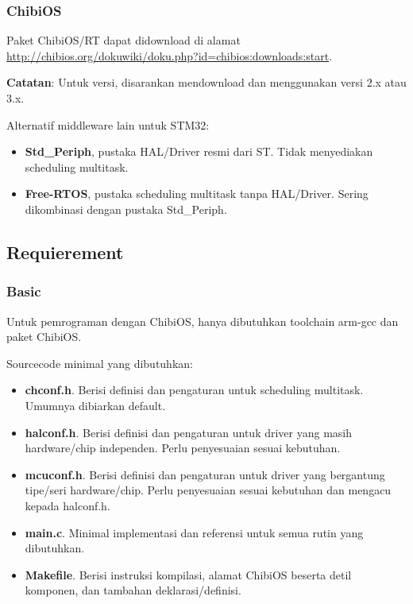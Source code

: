 \documentclass[table,dvipsnames]{beamer}
\begin{document}
	\begin{frame}
		\frametitle{ChibiOS}
		\begin{exampleblock}{}
			Paket ChibiOS/RT dapat didownload di alamat\\
			\url{http://chibios.org/dokuwiki/doku.php?id=chibios:downloads:start}.
		\end{exampleblock}

		\begin{exampleblock}{}
			\textbf{Catatan}: Untuk versi, disarankan mendownload dan menggunakan versi 2.x atau 3.x.
		\end{exampleblock}

		\begin{exampleblock}{}
			Alternatif middleware lain untuk STM32:
			\begin{itemize}
				\item \textbf{Std\_Periph}, pustaka HAL/Driver resmi dari ST. Tidak menyediakan scheduling multitask.
				\item \textbf{Free-RTOS}, pustaka scheduling multitask tanpa HAL/Driver. Sering dikombinasi dengan pustaka Std\_Periph.
			\end{itemize}
		\end{exampleblock}
	\end{frame}

	\subsection{Requierement}
	\begin{frame}
		\frametitle{Basic}
		\begin{exampleblock}{}
			Untuk pemrograman dengan ChibiOS, hanya dibutuhkan toolchain arm-gcc dan paket ChibiOS.
		\end{exampleblock}

		\begin{exampleblock}{}
			Sourcecode minimal yang dibutuhkan:
			\begin{itemize}
				\item \textbf{chconf.h}. Berisi definisi dan pengaturan untuk scheduling multitask.
				Umumnya dibiarkan default.
				\item \textbf{halconf.h}. Berisi definisi dan pengaturan untuk driver yang masih hardware/chip independen.
				Perlu penyesuaian sesuai kebutuhan.
				\item \textbf{mcuconf.h}. Berisi definisi dan pengaturan untuk driver yang bergantung tipe/seri hardware/chip.
				Perlu penyesuaian sesuai kebutuhan dan mengacu kepada halconf.h.
				\item \textbf{main.c}. Minimal implementasi dan referensi untuk semua rutin yang dibutuhkan.
				\item \textbf{Makefile}. Berisi instruksi kompilasi, alamat ChibiOS beserta detil komponen, dan tambahan deklarasi/definisi.
			\end{itemize}
		\end{exampleblock}
	\end{frame}
\end{document}
